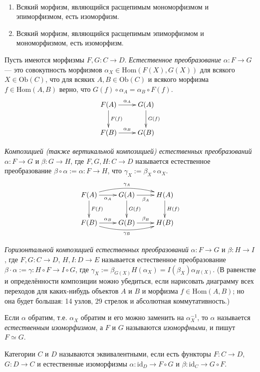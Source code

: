 \documentclass[12pt,a4paper]{article}
\newcommand{\Hom}{\mathrm{Hom}}
\newcommand{\Ob}{\mathrm{Ob}}
\newcommand{\id}{\mathrm{id}}
\begin{document}
    \begin{lemma}\ 
        \begin{enumerate}
            \item Всякий морфизм, являющийся расщепимым мономорфизмом и эпиморфизмом, есть изоморфизм.
            \item Всякий морфизм, являющийся расщепимым эпиморфизмом и мономорфизмом, есть изоморфизм.
        \end{enumerate}
    \end{lemma}

    \begin{definition}
        Пусть имеются морфизмы $F, G: C \to D$. \emph{Естественное преобразование} $\alpha: F \to G$ --- это совокупность морфизмов $\alpha_X \in \Hom(F(X), G(X))$ для всякого $X \in \Ob(C)$, что для всяких $A, B \in \Ob(C)$ и всякого морфизма $f \in \Hom(A, B)$ верно, что $G(f) \circ \alpha_A = \alpha_B \circ F(f)$.
        \[
            \xymatrix{
                F(A) \ar[r]^{\alpha_A} \ar[d]^{F(f)} & G(A) \ar[d]^{G(f)}\\
                F(B) \ar[r]^{\alpha_B} & G(B)\\
            }
        \]

        \emph{Композицией (также вертикальной композицией) естественных преобразований} $\alpha: F \to G$ и $\beta: G \to H$, где $F, G, H: C \to D$ называется естественное преобразование $\beta \circ \alpha := \alpha: F \to H$, что $\gamma_X := \beta_X \circ \alpha_X$.
        \[
            \xymatrix{
                F(A) \ar[r]_{\alpha_A} \ar[d]^{F(f)} \ar@/^1em/[rr]^{\gamma_A} & G(A) \ar[r]_{\beta_A} \ar[d]^{G(f)} & H(A) \ar[d]^{H(f)}\\
                F(B) \ar[r]^{\alpha_B} \ar@/_1em/[rr]_{\gamma_B} & G(B) \ar[r]^{\beta_B} & H(B)\\
            }
        \]

        \emph{Горизонтальной композицией естественных преобразований} $\alpha: F \to G$ и $\beta: H \to I$, где $F, G: C \to D$, $H, I: D \to E$ называется естественное преобразование $\beta \cdot \alpha := \gamma: H \circ F \to I \circ G$, где $\gamma_X := \beta_{G(X)} H(\alpha_X) = I(\beta_X) \alpha_{H(X)}$. (В равенстве и определённости композиции можно убедиться, если нарисовать диаграмму всех переходов для каких-нибудь объектов $A$ и $B$ и морфизма $f \in \Hom(A, B)$; но она будет большая: 14 узлов, 29 стрелок и абсолютная коммутативность.)
        
        Если $\alpha$ обратим, т.е. $\alpha_X$ обратим и его можно заменить на $\alpha_X^{-1}$, то $\alpha$ называется \emph{естественным изоморфизмом}, а $F$ и $G$ называются \emph{изоморфными}, и пишут $F \simeq G$.

        Категории $C$ и $D$ называются эквивалентными, если есть функторы $F: C \to D$, $G: D \to C$ и естественные изоморфизмы $\alpha: \id_D \to F \circ G$ и $\beta: \id_C \to G \circ F$.
    \end{definition}
\end{document}
